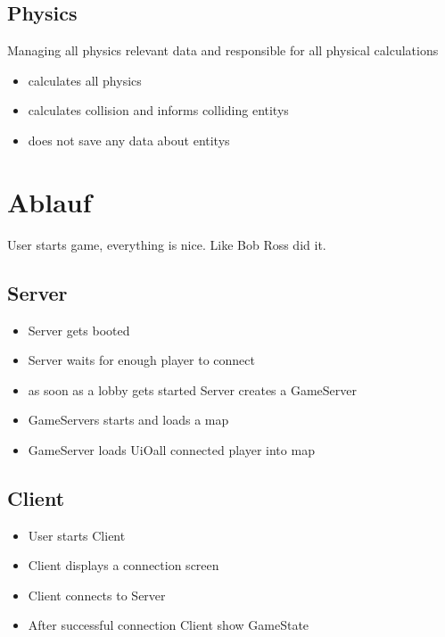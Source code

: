 \documentclass[parskip=full]{scrartcl}
\begin{document}
\subsection{Physics}
Managing all physics relevant data and responsible for all physical calculations
\begin{itemize}
	\item calculates all physics
	\item calculates collision and informs colliding entitys
	\item does not save any data about entitys
\end{itemize}
\section{Ablauf} %
User starts game, everything is nice. Like Bob Ross did it.

\subsection{Server}
\begin{itemize}
	\item Server gets booted
	\item Server waits for enough player to connect
	\item as soon as a lobby gets started Server creates a GameServer
	\item GameServers starts and loads a map
	\item GameServer loads UiOall connected player into map
\end{itemize}


\subsection{Client}
\begin{itemize}
	\item User starts Client
	\item Client displays a connection screen
	\item Client connects to Server
	\item After successful connection Client show GameState
\end{itemize}
\end{document}
